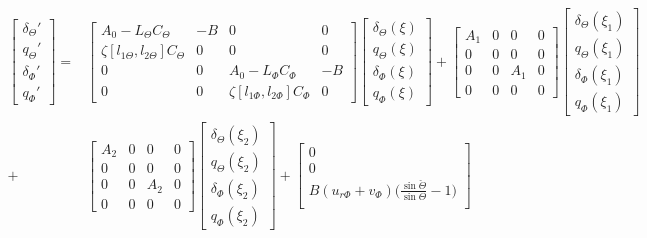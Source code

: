 \documentclass[main.tex]{subfiles}
\begin{document}
	
	\begin{align}
	\begin{bmatrix}
	\delta_\Theta' \\
	q_\Theta' \\
	\delta_\Phi' \\
	q_\Phi' 
	\end{bmatrix} =&
	\begin{bmatrix}
	A_0 - L_\Theta C_\Theta & -B & 0 & 0\\
	\zeta [l_{1\Theta},l_{2\Theta}]C_\Theta & 0 & 0 & 0 \\
	0 & 0 & A_0 - L_\Phi C_\Phi & -B \\
	0 & 0 & \zeta [l_{1\Phi},l_{2\Phi}]C_\Phi &0
	\end{bmatrix}
	\begin{bmatrix}
	\delta_\Theta(\xi) \\
	q_\Theta (\xi) \\
	\delta_\Phi(\xi) \\
	q_\Phi(\xi)
	\end{bmatrix} + 
	\begin{bmatrix}
	A_1 & 0 & 0 & 0\\
	0 & 0 & 0 & 0 \\
	0 & 0 & A_1 & 0\\
	0 & 0 & 0 & 0 
	\end{bmatrix}
	\begin{bmatrix}
	\delta_\Theta(\xi_1) \\
	q_\Theta (\xi_1) \\
	\delta_\Phi(\xi_1) \\
	q_\Phi (\xi_1)
	\end{bmatrix} \nonumber \\
	+&\begin{bmatrix}
	A_2 & 0 & 0 & 0\\
	0 & 0 & 0 & 0 \\
	0 & 0 & A_2 & 0\\
	0 & 0 & 0 & 0 
	\end{bmatrix}
	\begin{bmatrix}
	\delta_\Theta(\xi_2) \\
	q_\Theta (\xi_2) \\
	\delta_\Phi(\xi_2) \\
	q_\Phi (\xi_2)
	\end{bmatrix} + 
	\begin{bmatrix}
	0 \\
	0 \\
	B(u_{r\Phi} + v_\Phi)\big(\frac{\sin \check{\Theta}}{\sin \Theta} - 1\big) \\

\end{bmatrix}
\end{align}
\end{document}

